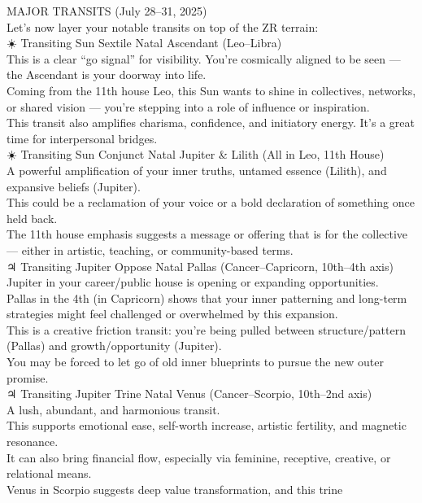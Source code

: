 \documentclass{article}
\begin{document}
 MAJOR TRANSITS (July 28--31, 2025)\\
Let's now layer your notable transits on top of the ZR terrain:\\
☀️ Transiting Sun Sextile Natal Ascendant (Leo--Libra)\\
This is a clear ``go signal'' for visibility. You're cosmically aligned
to be seen --- the Ascendant is your doorway into life.\\
Coming from the 11th house Leo, this Sun wants to shine in collectives,
networks, or shared vision --- you're stepping into a role of influence
or inspiration.\\
This transit also amplifies charisma, confidence, and initiatory energy.
It's a great time for interpersonal bridges.\\
☀️ Transiting Sun Conjunct Natal Jupiter \& Lilith (All in Leo, 11th
House)\\
A powerful amplification of your inner truths, untamed essence (Lilith),
and expansive beliefs (Jupiter).\\
This could be a reclamation of your voice or a bold declaration of
something once held back.\\
The 11th house emphasis suggests a message or offering that is for the
collective --- either in artistic, teaching, or community-based terms.\\
♃ Transiting Jupiter Oppose Natal Pallas (Cancer--Capricorn, 10th--4th
axis)\\
Jupiter in your career/public house is opening or expanding
opportunities.\\
Pallas in the 4th (in Capricorn) shows that your inner patterning and
long-term strategies might feel challenged or overwhelmed by this
expansion.\\
This is a creative friction transit: you're being pulled between
structure/pattern (Pallas) and growth/opportunity (Jupiter).\\
You may be forced to let go of old inner blueprints to pursue the new
outer promise.\\
♃ Transiting Jupiter Trine Natal Venus (Cancer--Scorpio, 10th--2nd
axis)\\
A lush, abundant, and harmonious transit.\\
This supports emotional ease, self-worth increase, artistic fertility,
and magnetic resonance.\\
It can also bring financial flow, especially via feminine, receptive,
creative, or relational means.\\
Venus in Scorpio suggests deep value transformation, and this trine
\end{document}
